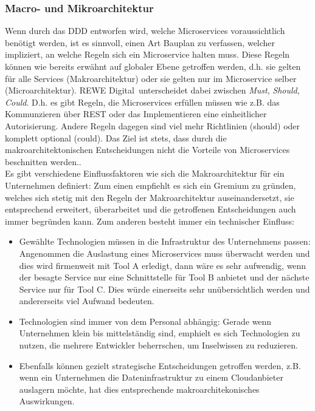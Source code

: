 \subsubsection{Macro- und Mikroarchitektur}

Wenn durch das DDD entworfen wird, welche Microservices voraussichtlich benötigt werden, ist es sinnvoll, einen Art Bauplan zu verfassen, welcher impliziert, an welche Regeln sich ein Microservice halten muss. Diese Regeln können wie bereits erwähnt auf globaler Ebene getroffen werden, d.h. sie gelten für alle Services (Makroarchitektur) oder sie gelten nur im Microservice selber (Microarchitektur). REWE Digital unterscheidet dabei zwischen \textit{Must}, \textit{Should}, \textit{Could}. D.h. es gibt Regeln, die Microservices erfüllen müssen wie z.B. das Kommunzieren über REST oder das Implementieren eine einheitlicher Autorisierung.\cite{rewe2019mic_ppp} Andere Regeln dagegen sind viel mehr Richtlinien (should) oder komplett optional (could). Das Ziel ist stets, dass durch die makroarchitektonischen Entscheidungen nicht die Vorteile von Microservices beschnitten werden.\cite{wolff2018mic_praxis}\cite{irakli2016mic_arc}. \\

Es gibt verschiedene Einflussfaktoren wie sich die Makroarchitektur für ein Unternehmen definiert: Zum einen empfiehlt es sich ein Gremium zu gründen, welches sich stetig mit den Regeln der Makroarchitektur auseinandersetzt, sie entsprechend erweitert, überarbeitet und die getroffenen Entscheidungen auch immer begründen kann.\cite{wolff2018mic_praxis} Zum anderen besteht immer ein technischer Einfluss\cite{wolff2018mic_praxis}:
\begin{itemize}
	\item Gewählte Technologien müssen in die Infrastruktur des Unternehmens passen: Angenommen die Auslastung eines Microservices muss überwacht werden und dies wird firmenweit mit Tool A erledigt, dann wäre es sehr aufwendig, wenn der besagte Service nur eine Schnittstelle für Tool B anbietet und der nächste Service nur für Tool C. Dies würde einerseits sehr unübersichtlich werden und andererseits viel Aufwand bedeuten. 
	\item Technologien sind immer von dem Personal abhängig: Gerade wenn Unternehmen klein bis mittelständig sind, emphielt es sich Technologien zu nutzen, die mehrere Entwickler beherrschen, um Inselwissen zu reduzieren. 
	\item Ebenfalls können gezielt strategische Entscheidungen getroffen werden, z.B. wenn ein Unternehmen die Dateninfrastruktur zu einem Cloudanbieter auslagern möchte, hat dies entsprechende makroarchitekonisches Auswirkungen.
\end{itemize}

